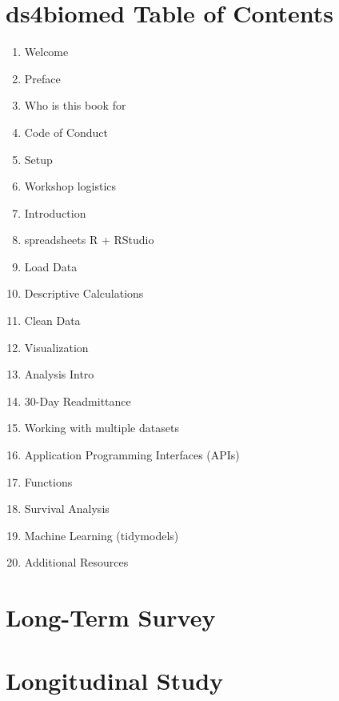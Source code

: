 \documentclass[../main.tex]{subfiles}
\begin{document}
  \section{ds4biomed Table of Contents}
    \label{ase:ds4biomed-toc}

      \begin{enumerate}
        \item Welcome
        \item Preface
        \item Who is this book for
        \item Code of Conduct
        \item Setup
        \item Workshop logistics
        \item Introduction
        \item spreadsheets R + RStudio
        \item Load Data
        \item Descriptive Calculations
        \item Clean Data
        \item Visualization
        \item Analysis Intro
        \item 30-Day Readmittance
        \item Working with multiple datasets
        \item Application Programming Interfaces (APIs)
        \item Functions
        \item Survival Analysis
        \item Machine Learning (tidymodels)
        \item Additional Resources
      \end{enumerate}

  \section{Long-Term Survey}
      \label{ase:long-term-survey}

  \section{Longitudinal Study}
      \label{ase:longitudinal-study}
\end{document}
